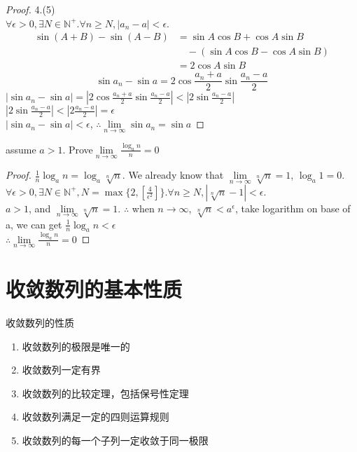 \begin{proof}4.(5)\\
	$\forall \epsilon >0, \exists N \in \mathbb{N}^+. \forall n \geqslant N, |a_n-a| < \epsilon$.\\
	\begin{align*}
		\sin(A+B)-\sin(A-B) &= \sin{A}\cos{B}+\cos{A}\sin{B} \\
		&\quad- (\sin{A}\cos{B}-\cos{A}\sin{B}) \\
		&= 2\cos{A}\sin{B}
	\end{align*}
	\begin{equation*}
		\sin a_n - \sin a  = 2\cos\frac{a_n+a}{2}\sin\frac{a_n-a}{2}
	\end{equation*}
	$|\sin a_n-\sin a| = |2\cos\frac{a_n+a}{2}\sin\frac{a_n-a}{2}|< |2\sin\frac{a_n-a}{2}|$\\
	$ |2\sin\frac{a_n-a}{2}|<|2\frac{a_n-a}{2}|=\epsilon $\\
	$ |\sin{a_n}-\sin{a}|<\epsilon $, $ \therefore \lim\limits_{n\rightarrow\infty}\sin{a_n} = \sin a  $
\end{proof}

	assume $ a>1 $. Prove$ \lim\limits_{n\rightarrow\infty}\frac{\log_a n}{n} = 0 $
\begin{proof}
	$\frac{1}{n}\log_a n = \log_a \sqrt[n]{n}$. We already know that $  \lim\limits_{n\rightarrow\infty}\sqrt[n]{n} = 1 $, $ \log_a 1 = 0 $.\\
	$\forall \epsilon >0, \exists N \in \mathbb{N}^+, N = \max\{2,[\frac{4}{\epsilon^2}]\}. \forall n \geqslant N, |\sqrt[n]{n}-1| < \epsilon$.\\
	\color{red}$ a>1 $, and $ \lim\limits_{n\rightarrow\infty}\sqrt[n]{n} = 1 $. $ \therefore  $ when $ n\rightarrow \infty $, $ \sqrt[n]{n}<a^\epsilon $, take logarithm on base of a, we can get $ \frac{1}{n}\log_a {n}<\epsilon $ 	\\
	\color{black}
	$ \therefore \lim\limits_{n\rightarrow\infty} \frac{\log_a n}{n} = 0 $
\end{proof}



\section{收敛数列的基本性质}
\date{2021.5.6}
收敛数列的性质
\begin{enumerate}
	\item 收敛数列的极限是唯一的
	\item 收敛数列一定有界
	\item 收敛数列的比较定理，包括保号性定理
	\item 收敛数列满足一定的四则运算规则
	\item 收敛数列的每一个子列一定收敛于同一极限
\end{enumerate}
